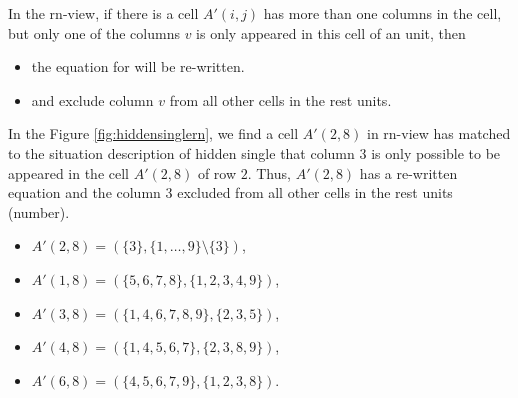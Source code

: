 \documentclass[11pt]{report}
\newcommand{\set}[1]{\{ #1 \}}
\begin{document}
In the rn-view, if there is a cell $A'(i,j)$ has more than one columns in the cell, but only one of the columns $v$ is only appeared in this cell of an unit, then
\begin{itemize}
\item the equation for will be re-written.
\item and exclude column $v$ from all other cells in the rest units.
\end{itemize}
In the Figure \ref{fig:hiddensinglern}, we find a cell $A'(2,8)$ in rn-view has matched to the situation description of hidden single that column $3$ is only possible to be appeared in the cell $A'(2,8)$ of row $2$. Thus, $A'(2,8)$ has a re-written equation and the column $3$ excluded from all other cells in the rest units (number).
\begin{itemize}
\item $A'(2,8) = (\set{3}, \set{1,\dots,9} \setminus \set{3})$,
\item $A'(1,8) = (\set{5, 6, 7, 8}, \set{1, 2, 3, 4, 9})$,
\item $A'(3,8) = (\set{1, 4, 6, 7, 8, 9}, \set{2, 3, 5})$,
\item $A'(4,8) = (\set{1, 4, 5, 6, 7}, \set{2, 3, 8, 9})$,
\item $A'(6,8) = (\set{4, 5, 6, 7, 9}, \set{1, 2, 3, 8})$.
\end{itemize}
\end{document}
